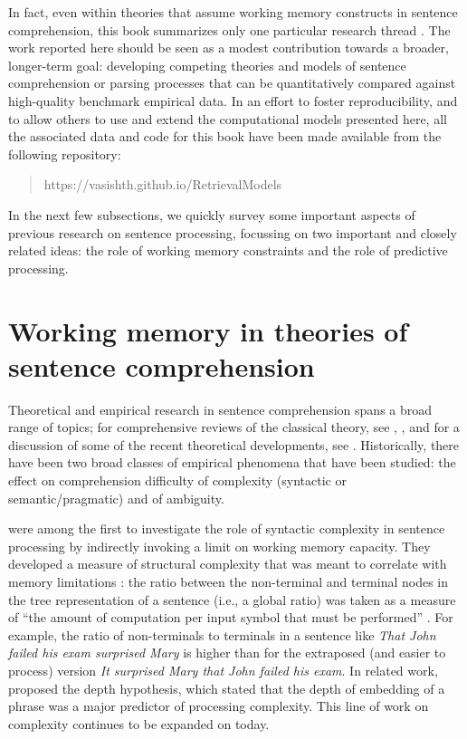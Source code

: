 \documentclass{cambridge7A}\usepackage[]{graphicx}\usepackage[]{color}
\begin{document}
In fact, even within theories that assume working memory constructs in sentence comprehension, this book summarizes only one particular research thread  . The work reported here should be seen as a modest contribution towards a broader, longer-term goal: developing competing theories and models of sentence
comprehension or parsing processes that can be quantitatively compared against high-quality benchmark empirical data.  In an effort to foster reproducibility, and to allow others to use and extend the computational models presented here, all the associated data and code for this book have been made available from the following repository:

\begin{quote}
https://vasishth.github.io/RetrievalModels
\end{quote}

In the next few subsections, we quickly survey some important aspects of previous research on sentence processing, focussing on two important and closely related ideas: the role of working memory constraints and the role of predictive processing.

\section{Working memory in theories of sentence comprehension}


Theoretical and empirical research in sentence comprehension spans a
broad range of topics; for comprehensive reviews of the classical
theory, see \cite{Frazier1987}, \cite{PickeringVanGompel2006}, and for
a discussion of some of the recent theoretical developments, see
\cite{traxler2014trends}. Historically, there have been two broad
classes of empirical phenomena that have been studied: the effect on
comprehension difficulty of complexity (syntactic or
semantic/pragmatic) and of ambiguity.

\cite{MillerChomsky63} were among the first to investigate the role of 
syntactic complexity in sentence processing by indirectly invoking a
limit on working memory capacity. They developed a measure of 
structural complexity that was meant to correlate with memory
limitations \cite[480-482]{MillerChomsky63}: the ratio between the
non-terminal and terminal nodes in the tree representation of a
sentence (i.e., a global ratio) was taken as a measure of ``the amount
of computation per input symbol that must be performed''
\cite[480]{MillerChomsky63}.  For example, the ratio of non-terminals
to terminals in a sentence like \textit{That John failed his exam
surprised Mary} is higher than for the extraposed (and easier
to process) version \textit{It surprised Mary that John failed his
exam}.  In related work, \cite{yngve} proposed the depth hypothesis, 
which stated that the depth of embedding of a phrase was a major
predictor of processing complexity. This line of work on complexity
continues to be expanded on today.
\end{document}
